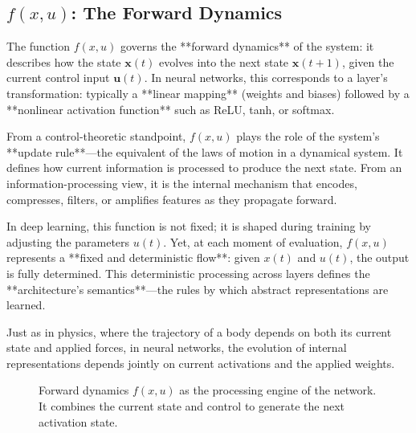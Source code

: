 \subsection{\(f(x, u)\): The Forward Dynamics}

The function \(f(x, u)\) governs the **forward dynamics** of the system: it describes how the state \(\mathbf{x}(t)\) evolves into the next state \(\mathbf{x}(t+1)\), given the current control input \(\mathbf{u}(t)\). In neural networks, this corresponds to a layer’s transformation: typically a **linear mapping** (weights and biases) followed by a **nonlinear activation function** such as ReLU, tanh, or softmax.

From a control-theoretic standpoint, \(f(x, u)\) plays the role of the system’s **update rule**—the equivalent of the laws of motion in a dynamical system. It defines how current information is processed to produce the next state. From an information-processing view, it is the internal mechanism that encodes, compresses, filters, or amplifies features as they propagate forward.

In deep learning, this function is not fixed; it is shaped during training by adjusting the parameters \(u(t)\). Yet, at each moment of evaluation, \(f(x, u)\) represents a **fixed and deterministic flow**: given \(x(t)\) and \(u(t)\), the output is fully determined. This deterministic processing across layers defines the **architecture's semantics**—the rules by which abstract representations are learned.

Just as in physics, where the trajectory of a body depends on both its current state and applied forces, in neural networks, the evolution of internal representations depends jointly on current activations and the applied weights.

\begin{figure}[H]
\centering
{}
\caption{Forward dynamics \(f(x, u)\) as the processing engine of the network. It combines the current state and control to generate the next activation state.}
\end{figure}


